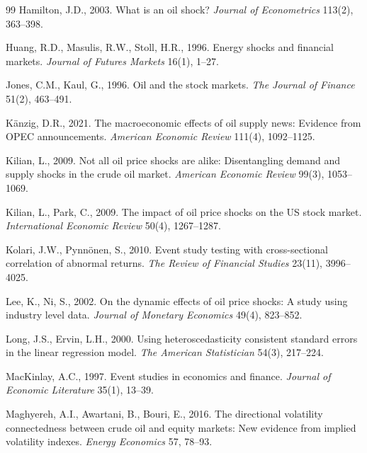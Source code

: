 \documentclass[12pt,preprint,authoryear]{elsarticle}
\begin{document}
\begin{thebibliography}{99}
Hamilton, J.D., 2003. What is an oil shock? \textit{Journal of Econometrics} 113(2), 363--398.

Huang, R.D., Masulis, R.W., Stoll, H.R., 1996. Energy shocks and financial markets. \textit{Journal of Futures Markets} 16(1), 1--27.

Jones, C.M., Kaul, G., 1996. Oil and the stock markets. \textit{The Journal of Finance} 51(2), 463--491.

K\"{a}nzig, D.R., 2021. The macroeconomic effects of oil supply news: Evidence from OPEC announcements. \textit{American Economic Review} 111(4), 1092--1125.

Kilian, L., 2009. Not all oil price shocks are alike: Disentangling demand and supply shocks in the crude oil market. \textit{American Economic Review} 99(3), 1053--1069.

Kilian, L., Park, C., 2009. The impact of oil price shocks on the US stock market. \textit{International Economic Review} 50(4), 1267--1287.

Kolari, J.W., Pynnönen, S., 2010. Event study testing with cross-sectional correlation of abnormal returns. \textit{The Review of Financial Studies} 23(11), 3996--4025.

Lee, K., Ni, S., 2002. On the dynamic effects of oil price shocks: A study using industry level data. \textit{Journal of Monetary Economics} 49(4), 823--852.

Long, J.S., Ervin, L.H., 2000. Using heteroscedasticity consistent standard errors in the linear regression model. \textit{The American Statistician} 54(3), 217--224.

MacKinlay, A.C., 1997. Event studies in economics and finance. \textit{Journal of Economic Literature} 35(1), 13--39.

Maghyereh, A.I., Awartani, B., Bouri, E., 2016. The directional volatility connectedness between crude oil and equity markets: New evidence from implied volatility indexes. \textit{Energy Economics} 57, 78--93.


\end{thebibliography}
\end{document}
